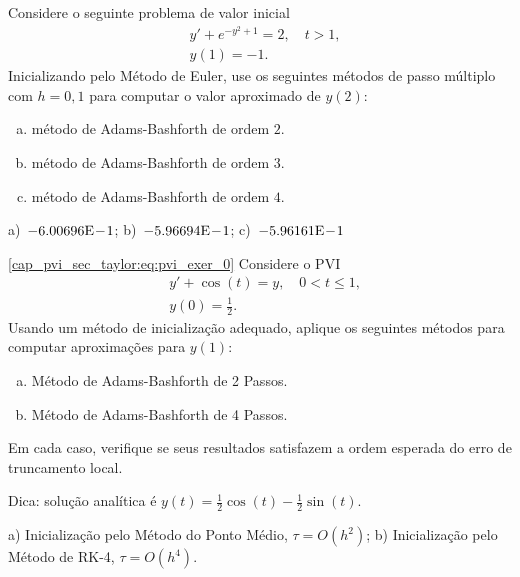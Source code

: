 \begin{exer}
  Considere o seguinte problema de valor inicial
  \begin{subequations}
    \begin{align}
      &y' + e^{-y^2+1} = 2,\quad t>1,\\
      &y(1) = -1.
    \end{align}
  \end{subequations}
  Inicializando pelo Método de Euler, use os seguintes métodos de passo múltiplo com $h=0,1$ para computar o valor aproximado de $y(2)$:
  \begin{enumerate}[a)]
  \item método de Adams-Bashforth de ordem $2$.
  \item método de Adams-Bashforth de ordem $3$.
  \item método de Adams-Bashforth de ordem $4$.
  \end{enumerate}
\end{exer}
\begin{resp}
  a)~$-6.00696\mathrm{E}\!-\!1$; b)~$-5.96694\mathrm{E}\!-\!1$; c)~$-5.96161\mathrm{E}\!-\!1$
\end{resp}

\begin{exer}\eqref{cap_pvi_sec_taylor:eq:pvi_exer_0}
  Considere o PVI
  \begin{subequations}
    \begin{align}
      &y' + \cos(t) = y,\quad 0 < t \leq 1,\\
      &y(0) = \frac{1}{2}.
    \end{align}
  \end{subequations}
  Usando um método de inicialização adequado, aplique os seguintes métodos para computar aproximações para $y(1)$:
  \begin{enumerate}[a)]
  \item Método de Adams-Bashforth de 2 Passos.
  \item Método de Adams-Bashforth de 4 Passos.
  \end{enumerate}
  Em cada caso, verifique se seus resultados satisfazem a ordem esperada do erro de truncamento local.
\end{exer}
\begin{resp}
  Dica: solução analítica é $y(t) = \frac{1}{2}\cos(t) - \frac{1}{2}\sin(t)$.
  
  a) Inicialização pelo Método do Ponto Médio, $\tau = O(h^2)$; b) Inicialização pelo Método de RK-4, $\tau = O(h^4)$.
\end{resp}

